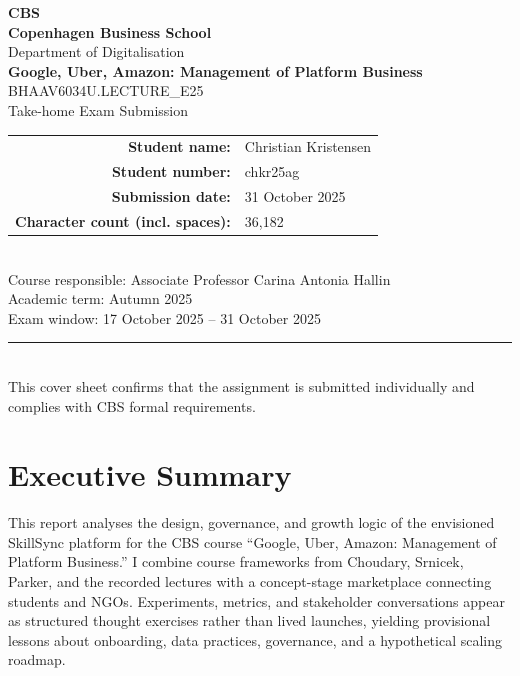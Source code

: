 \documentclass[12pt,a4paper]{article}
\newcommand{\university}{Copenhagen Business School}
\newcommand{\faculty}{Department of Digitalisation}
\newcommand{\examTitle}{Google, Uber, Amazon: Management of Platform Business}
\newcommand{\examCode}{BHAAV6034U.LECTURE\_E25}
\newcommand{\examType}{Take-home Exam Submission}
\newcommand{\studentName}{Christian Kristensen}
\newcommand{\studentId}{chkr25ag}
\newcommand{\submissionDate}{31 October 2025}
\newcommand{\wordCount}{36,182}
\begin{document}
\begin{titlepage}
  \thispagestyle{empty}
  \centering
  {\Large \textcolor{gray!70}{\textbf{CBS}}}\\[1cm]
  {\Large \textbf{\university}}\\[0.5cm]
  {\large \faculty}\\[1.5cm]
  {\LARGE \textbf{\examTitle}}\\[0.5cm]
  {\large \examCode\\\examType}\\[1.5cm]
  \begin{tabular}{rl}
    \textbf{Student name:} & \studentName \\
    \textbf{Student number:} & \studentId \\
    \textbf{Submission date:} & \submissionDate \\
    \textbf{Character count (incl. spaces):} & \wordCount \\
  \end{tabular}\\[1.5cm]
  \vfill
  {\large Course responsible: Associate Professor Carina Antonia Hallin}\\[0.3cm]
  {\large Academic term: Autumn 2025}\\[0.3cm]
  {\large Exam window: 17 October 2025 -- 31 October 2025}\\[1.5cm]
  \rule{0.8\linewidth}{0.4pt}\\[0.5cm]
  {\small This cover sheet confirms that the assignment is submitted individually and complies with CBS formal requirements.}
\end{titlepage}

\setcounter{secnumdepth}{-1}
\makeatletter
\renewcommand{\numberline}[1]{}
\makeatother

\section*{Executive Summary}
This report analyses the design, governance, and growth logic of the envisioned SkillSync platform for the CBS course ``Google, Uber, Amazon: Management of Platform Business.'' I combine course frameworks from Choudary, Srnicek, Parker, and the recorded lectures with a concept-stage marketplace connecting students and NGOs. Experiments, metrics, and stakeholder conversations appear as structured thought exercises rather than lived launches, yielding provisional lessons about onboarding, data practices, governance, and a hypothetical scaling roadmap.
\end{document}
